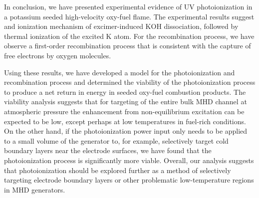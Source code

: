 In conclusion, we have presented experimental evidence of UV photoionization in a potassium seeded high-velocity oxy-fuel flame. The experimental results suggest and ionization mechanism of excimer-induced KOH dissociation, followed by thermal ionization of the excited K atom. For the recombination process, we have observe a first-order recombination process that is consistent with the capture of free electrons by oxygen molecules. 

Using these results, we have developed a model for the photoionization and recombination process and determined the viability of the photoionization process to produce a net return in energy in seeded oxy-fuel combustion products. The viability analysis suggests that for targeting of the entire bulk MHD channel at atmospheric pressure the enhancement from non-equilibrium excitation can be expected to be low, except perhaps at low temperatures in fuel-rich conditions. On the other hand, if the photoionization power input only needs to be applied to a small volume of the generator to, for example, selectively target cold boundary layers near the electrode surfaces, we have found that the photoionization process is significantly more viable. Overall, our analysis suggests that photoionization should be explored further as a method of selectively targeting electrode boundary layers or other problematic low-temperature regions in MHD generators.